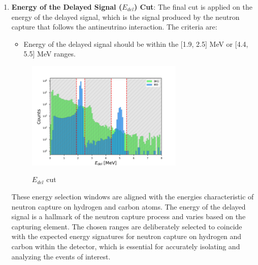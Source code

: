 \begin{enumerate}
	\item \textbf{Energy of the Delayed Signal ($E_{del}$) Cut}: The final cut is applied on the energy of the delayed signal, which is the signal produced by the neutron capture that follows the antineutrino interaction. The criteria are:
	\begin{itemize}
		\item Energy of the delayed signal should be within the [1.9, 2.5] MeV or [4.4, 5.5] MeV ranges.
	\end{itemize}
	
	\begin{adjustbox}{minipage={\linewidth}, valign=t}
		
		\begin{figure}
			
			\vspace{-2\baselineskip}
			\caption{$E_{del}$ cut}
			\vspace{-0.5\baselineskip}
			\includegraphics[width=7.5cm]{Images/Cut/e_del.png}
			\label{fig:e_del_cut}
			
		\end{figure}
		
		\vspace*{0.15cm}
		
		These energy selection windows are aligned with the energies characteristic of neutron capture on hydrogen and carbon atoms. The energy of the delayed signal is a hallmark of the neutron capture process and varies based on the capturing element. The chosen ranges are deliberately selected to coincide with the expected energy signatures for neutron capture on hydrogen and carbon within the detector, which is essential for accurately isolating and analyzing the events of interest.
		\newline
		
	\end{adjustbox}

\end{enumerate}

